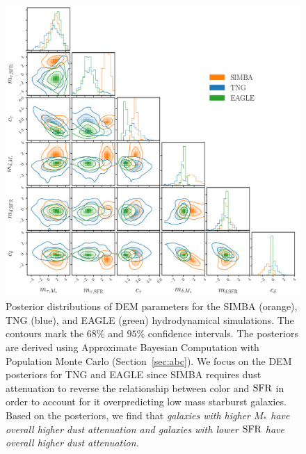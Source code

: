 \begin{figure}
\begin{center}
    \includegraphics[width=\textwidth]{figs/abc.pdf}
    \caption{\label{fig:abc}
    Posterior distributions of DEM parameters for the SIMBA (orange), TNG
    (blue), and EAGLE (green) hydrodynamical simulations. The contours mark the $68\%$
    and $95\%$ confidence intervals. The posteriors are derived using
    Approximate Bayesian Computation with Population Monte Carlo
    (Section~\ref{sec:abc}). We focus on the DEM posteriors for TNG and EAGLE
    since SIMBA requires dust attenuation to reverse the relationship between
    color and ${\rm SFR}$ in order to account for it overpredicting low mass starburst 
    galaxies. Based on the posteriors, we find that \emph{galaxies with higher
    $M_*$ have overall higher dust attenuation and galaxies with lower ${\rm SFR}$
    have overall higher dust attenuation.}
    }
\end{center}
\end{figure}
